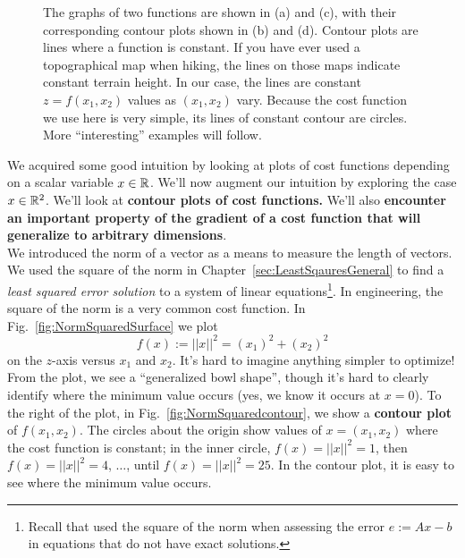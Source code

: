 \begin{figure}[thb]%
\centering
{}%
\hspace{5pt}%
%
\hspace{5pt}%
\hspace{5pt}%
%
    \caption[]{The graphs of two functions are shown in (a) and (c), with their corresponding contour plots shown in (b) and (d). Contour plots are lines where a function is constant. If you have ever used a topographical map when hiking, the lines on those maps indicate constant terrain height. In our case, the lines are constant $z=f(x_1,x_2)$ values as $(x_1,x_2)$ vary. Because the cost function we use here is very simple, its lines of constant contour are circles. More ``interesting'' examples will follow.}
    \label{fig:NormSquaredContourSurface}
\end{figure}

We acquired some good intuition by looking at plots of cost functions depending on a scalar variable $x\in \mathbb R$. We'll now augment our intuition by exploring the case $x\in \mathbb R^2$. We'll look at \textbf{contour plots of cost functions.} We'll also \textbf{encounter an important property of the gradient of a cost function that will generalize to arbitrary dimensions}.\\

We introduced the norm of a vector as a means to measure the length of vectors. We used the square of the norm in Chapter~\ref{sec:LeastSqauresGeneral} to find a \textit{least squared error solution} to a system of linear equations\footnote{Recall that used the square of the norm when assessing the error $e:=Ax-b$ in equations that do not have exact solutions.}. In engineering, the square of the norm is a very common cost function. In Fig.~\ref{fig:NormSquaredSurface} we plot 
$$f(x):=||x||^2=(x_1)^2 + (x_2)^2$$
on the $z$-axis versus $x_1$ and $x_2$. It's hard to imagine anything simpler to optimize! From the plot, we see a ``generalized bowl shape'', though it's hard to clearly identify where the minimum value occurs (yes, we know it occurs at $x=0$). To the right of the plot, in Fig.~\ref{fig:NormSquaredcontour}, we show a \textbf{contour plot} of $f(x_1,x_2)$. The circles about the origin show values of $x=(x_1,x_2)$ where the cost function is constant; in the inner circle, $f(x)=||x||^2=1$, then $f(x)=||x||^2=4$, $\ldots$, until $f(x)=||x||^2=25$. In the contour plot, it is easy to see where the minimum value occurs. \\

